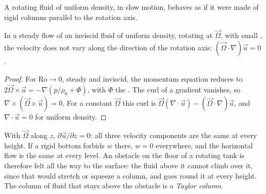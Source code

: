 A rotating fluid of uniform density, in slow motion, behaves as if it were
made of rigid columns parallel to the rotation axis.

\begin{theorem}\label{thm:b3:gfd-foundations:taylor-proudman}
In a steady flow of an inviscid fluid of uniform density, rotating at
$\vec\Omega$, with small , the velocity does not vary along
the direction of the rotation axis: $(\vec\Omega\cdot\nabla)\vec u = 0$.
\end{theorem}

\begin{proof}
For $\mathrm{Ro}\to 0$, steady and inviscid, the momentum equation reduces
to $2\vec\Omega\times\vec u = -\nabla(p/\rho_0 + \Phi)$, with $\Phi$ the
. The curl of a gradient vanishes, so $\nabla\times(\vec\Omega
\times\vec u) = 0$. For a constant $\vec\Omega$ this curl is $\vec\Omega
(\nabla\cdot\vec u) - (\vec\Omega\cdot\nabla)\vec u$, and $\nabla\cdot\vec u
= 0$ for uniform density.
\end{proof}

With $\vec\Omega$ along $z$, $\partial\vec u/\partial z = 0$: all three
velocity components are the same at every height. If a rigid bottom forbids
$w$ there, $w = 0$ everywhere, and the horizontal flow is the same at every
level. An obstacle on the floor of a rotating tank is therefore felt all
the way to the surface: the fluid above it cannot climb over it, since
that would stretch or squeeze a column, and goes round it at every height.
The column of fluid that stays above the obstacle is a \emph{Taylor
column}.

